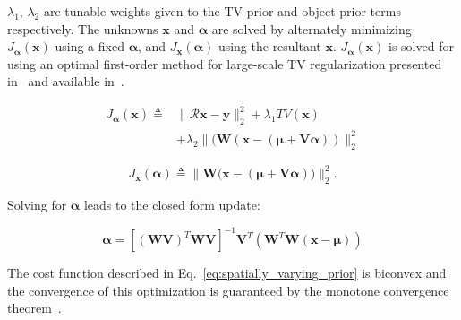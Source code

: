 \documentclass[journal]{IEEEtran}
\def\x{{\mathbf x}}
\begin{document}
$\lambda_1$, $\lambda_2$ are tunable weights given to the
TV-prior and object-prior terms respectively. The unknowns
$\boldsymbol{x}$ and $\boldsymbol{\alpha}$ are solved by alternately
minimizing $J_{\boldsymbol{\alpha}}(\boldsymbol{x})$ using a fixed
$\boldsymbol{\alpha}$, and $J_{\boldsymbol{x}}(\boldsymbol{\alpha})$
using the resultant $\boldsymbol{x}$.
$J_{\boldsymbol{\alpha}}(\boldsymbol{x})$ is solved for using an
optimal first-order method for large-scale TV regularization presented
in~\cite{TVReg} and available in~\cite{TVReg-lib}.

\begin{equation}
  \begin{split}
    J_{\boldsymbol{\alpha}}(\boldsymbol{\x}) \triangleq &\lVert\boldsymbol{\mathcal{R} x- y}\rVert_2^2  + \lambda_1TV(\boldsymbol{x}) \\
    &+\lambda_2\lVert(\boldsymbol{W}(\boldsymbol{x} - (\boldsymbol{\mu + V\alpha}))\rVert_2^2
  \end{split}
    \label{eq:compute_x}
  \end{equation}
  
\begin{equation}
  J_{\boldsymbol{x}}(\boldsymbol{\alpha}) \triangleq \lVert{\boldsymbol{W}(\boldsymbol{x}} - (\boldsymbol{\mu + V\alpha}))\rVert_2^2.
\end{equation}

Solving for $\boldsymbol{\alpha}$ leads to the closed form update:

\begin{equation}
  \boldsymbol{\alpha} = [(\boldsymbol{WV})^T\boldsymbol{WV}]^{-1}\boldsymbol{V}^T(\boldsymbol{W}^T\boldsymbol{W}(\boldsymbol{x} - \boldsymbol{\mu}))
  \label{eq:compute_alpha}
\end{equation}

The cost function described in Eq.~\ref{eq:spatially_varying_prior} is biconvex and the convergence of this optimization is guaranteed by the monotone convergence theorem~\cite{monotone}.
\end{document}
